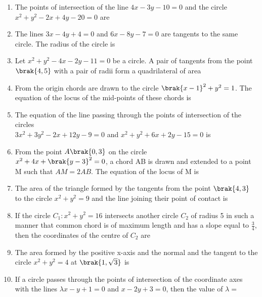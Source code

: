 \begin{enumerate}
		\hfill{}
\item The points of intersection of the line $4x-3y-10=0$ and the circle $x^{2}+y^{2}-2x+4y-20=0$ are    

	\hfill{}
\item The lines $3x-4y+4=0$ and $6x-8y-7=0$ are tangents to the same circle. The radius of the circle is

	\hfill{}
\item Let $x^{2}+y^{2}-4x-2y-11=0$ be a circle. A pair of tangents from the point $\brak{4,5}$ with a pair of radii form a quadrilateral of area

	\hfill{}
\item From the origin chords are drawn  to the circle $\brak{x-1}^{2}+y^{2}=1$. The equation of the locus of the mid-points of these chords is

	\hfill{}
\item The equation of the line passing through the points of intersection of the circles\\ $3x^{2}+3y^{2}-2x+12y-9=0$ and $x^{2}+y^{2}+6x+2y-15=0$ is

	\hfill{}
\item From the point $A\brak{0,3}$ on the circle \\            $x^{2}+4x+\brak{y-3}^{2}=0$, a chord AB is drawn and extended to a point M such that $AM=2AB$. The equation of the locus of M is 

	\hfill{}
\item The area of the triangle formed by the tangents from the point $\brak{4,3}$ to the circle $x^{2}+y^{2}=9$ and the line joining their point of contact is

	\hfill{}
\item If the circle $C_1:x^{2}+y^{2}=16$ intersects another circle $C_2$ of radius 5 in such a manner that common chord is of maximum length and has a slope equal to $\frac{3}{4}$, then the coordinates of the centre of $C_2$ are

	\hfill{}
\item The area formed by the positive x-axis and the normal and the tangent to the circle $x^{2}+y^{2}=4$ at $\brak{1,\sqrt{3}}$ is

	\hfill{}
\item If a circle passes through the points of intersection of the coordinate axes with the lines $\lambda x-y+1=0$ and $x-2y+3=0$, then the value of $\lambda =$


\end{enumerate}
